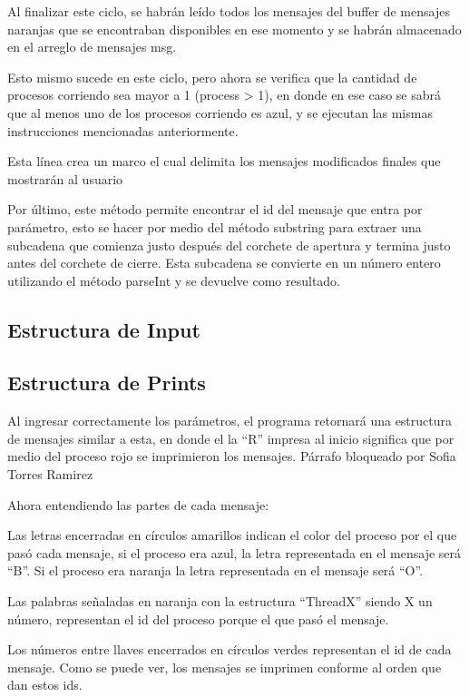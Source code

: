 \documentclass[a4paper]{article}
\begin{document}
        Al finalizar este ciclo, se habrán leído todos los mensajes del buffer de mensajes naranjas que se encontraban disponibles en ese momento y se habrán almacenado en el arreglo de mensajes msg. 

        Esto mismo sucede en este ciclo, pero ahora se verifica que la cantidad de procesos corriendo sea mayor a 1 (process > 1), en donde en ese caso se sabrá que al menos uno de los procesos corriendo es azul, y se ejecutan las mismas instrucciones mencionadas anteriormente. 

        Esta línea crea un marco el cual delimita los mensajes modificados finales que mostrarán al usuario 

        Por último, este método permite encontrar el id del mensaje que entra por parámetro, esto se hacer por medio del método substring para extraer una subcadena que comienza justo después del corchete de apertura y termina justo antes del corchete de cierre. Esta subcadena se convierte en un número entero utilizando el método parseInt y se devuelve como resultado. 

    \subsection{Estructura de Input}
    
    \subsection{Estructura de Prints}
    Al ingresar correctamente los parámetros, el programa retornará una estructura de mensajes similar a esta, en donde el la “R” impresa al inicio significa que por medio del proceso rojo se imprimieron los mensajes. 
    Párrafo bloqueado por Sofia Torres Ramirez

    Ahora entendiendo las partes de cada mensaje: 

    Las letras encerradas en círculos amarillos indican el color del proceso por el que pasó cada mensaje, si el proceso era azul, la letra representada en el mensaje será “B”. Si el proceso era naranja la letra representada en el mensaje será “O”. 

    Las palabras señaladas en naranja con la estructura “ThreadX” siendo X un número, representan el id del proceso porque el que pasó el mensaje. 

    Los números entre llaves encerrados en círculos verdes representan el id de cada mensaje. Como se puede ver, los mensajes se imprimen conforme al orden que dan estos ids. 
\end{document}
